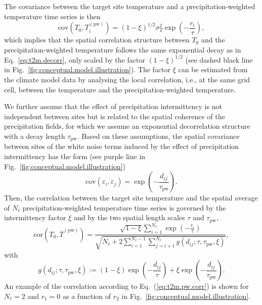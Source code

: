 \documentclass[cp, manuscript]{copernicus}
\begin{document}
The covariance between the target site temperature and a precipitation-weighted
temperature time series is then
%
\begin{equation}
\label{eq:t2m.pw.decorr}
\mathrm{cov}(T_0,T_i^{\mathrm{(pw)}})=
(1-\xi)^{1/2}\sigma_T^2\exp{\left(-\frac{r_i}{\tau}\right)},
\end{equation}
%
which implies that the spatial correlation structure between $T_0$ and the
precipitation-weighted temperature follows the same exponential decay as in
Eq.~\eqref{eq:t2m.decorr}, only scaled by the factor $(1-\xi)^{1/2}$ (see dashed
black line in Fig.~\ref{fig:conceptual.model.illustration}). The factor $\xi$
can be estimated from the climate model data by analysing the local correlation,
i.e., at the same grid cell, between the temperature and the
precipitation-weighted temperature.

We further assume that the effect of precipitation intermittency is not
independent between sites but is related to the spatial coherence of the
precipitation fields, for which we assume an exponential decorrelation structure
with a decay length $\tau_{\mathrm{pw}}$. Based on these assumptions, the
spatial covariance between sites of the white noise terms induced by the effect
of precipitation intermittency has the form (see purple line in
Fig.~\ref{fig:conceptual.model.illustration})
%
\begin{equation}
\label{eq:noise.cov}
\mathrm{cov}(\varepsilon_i,\varepsilon_j)=
\exp{\left(-\frac{d_{ij}}{\tau_{\mathrm{pw}}}\right)}.
\end{equation}
%
Then, the correlation between the target site temperature and the spatial
average of $N_{\ell}$ precipitation-weighted temperature time series is governed by the
intermittency factor $\xi$ and by the two spatial length scales $\tau$ and
$\tau_{\mathrm{pw}}$,
%
\begin{equation}
\label{eq:t2m.pw.corr}
\mathrm{cor}\left(T_0,\overline{T}^{\mathrm{(pw)}}\right)=
\frac
{\sqrt{1-\xi}\sum_{i=1}^{N_{\ell}}\exp{\left(-\frac{r_i}{\tau}\right)}}
{\sqrt{N_{\ell} + 2\sum_{i=1}^{N_{\ell}-1}\sum_{j=i+1}^{N_{\ell}}
  g(d_{ij}; \tau, \tau_{\mathrm{pw}}, \xi)}},
\end{equation}
%
with
\begin{equation}
\label{eq:exp.fun}
g(d_{ij}; \tau, \tau_{\mathrm{pw}}, \xi):=
(1-\xi)\exp{\left(-\frac{d_{ij}}{\tau}\right)} +
\xi\exp{\left(-\frac{d_{ij}}{\tau_{\mathrm{pw}}}\right)}.
\end{equation}
%
An example of the correlation according to Eq.~(\ref{eq:t2m.pw.corr}) is shown
for $N_{\ell}=2$ and $r_1=0$ as a function of $r_2$ in
Fig.~\ref{fig:conceptual.model.illustration}.
\end{document}
